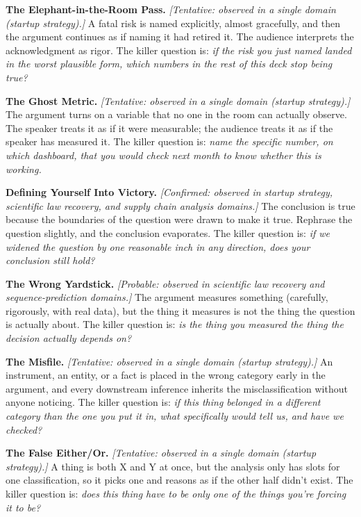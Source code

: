 \documentclass[11pt]{article}
\begin{document}
\textbf{The Elephant-in-the-Room Pass.} \emph{[Tentative: observed in a single domain (startup strategy).]} A fatal risk is named explicitly, almost gracefully, and then the argument continues as if naming it had retired it. The audience interprets the acknowledgment as rigor. The killer question is: \emph{if the risk you just named landed in the worst plausible form, which numbers in the rest of this deck stop being true?}

\textbf{The Ghost Metric.} \emph{[Tentative: observed in a single domain (startup strategy).]} The argument turns on a variable that no one in the room can actually observe. The speaker treats it as if it were measurable; the audience treats it as if the speaker has measured it. The killer question is: \emph{name the specific number, on which dashboard, that you would check next month to know whether this is working.}

\textbf{Defining Yourself Into Victory.} \emph{[Confirmed: observed in startup strategy, scientific law recovery, and supply chain analysis domains.]} The conclusion is true because the boundaries of the question were drawn to make it true. Rephrase the question slightly, and the conclusion evaporates. The killer question is: \emph{if we widened the question by one reasonable inch in any direction, does your conclusion still hold?}

\textbf{The Wrong Yardstick.} \emph{[Probable: observed in scientific law recovery and sequence-prediction domains.]} The argument measures something (carefully, rigorously, with real data), but the thing it measures is not the thing the question is actually about. The killer question is: \emph{is the thing you measured the thing the decision actually depends on?}

\textbf{The Misfile.} \emph{[Tentative: observed in a single domain (startup strategy).]} An instrument, an entity, or a fact is placed in the wrong category early in the argument, and every downstream inference inherits the misclassification without anyone noticing. The killer question is: \emph{if this thing belonged in a different category than the one you put it in, what specifically would tell us, and have we checked?}

\textbf{The False Either/Or.} \emph{[Tentative: observed in a single domain (startup strategy).]} A thing is both X and Y at once, but the analysis only has slots for one classification, so it picks one and reasons as if the other half didn't exist. The killer question is: \emph{does this thing have to be only one of the things you're forcing it to be?}
\end{document}
